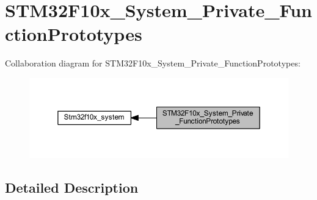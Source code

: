 \hypertarget{group___s_t_m32_f10x___system___private___function_prototypes}{}\section{S\+T\+M32\+F10x\+\_\+\+System\+\_\+\+Private\+\_\+\+Function\+Prototypes}
\label{group___s_t_m32_f10x___system___private___function_prototypes}
Collaboration diagram for S\+T\+M32\+F10x\+\_\+\+System\+\_\+\+Private\+\_\+\+Function\+Prototypes\+:
\nopagebreak
\begin{figure}[H]
\begin{center}
\leavevmode
\includegraphics[width=350pt]{group___s_t_m32_f10x___system___private___function_prototypes}
\end{center}
\end{figure}


\subsection{Detailed Description}
